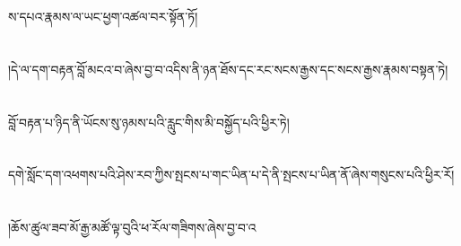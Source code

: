 ས་དཔའ་རྣམས་ལ་ཡང་ཕྱག་འཚལ་བར་སྟོན་ཏོ།\chapter{ }།དེ་ལ་དག་བརྟན་བློ་མངའ་བ་ཞེས་བྱ་བ་འདིས་ནི་ཉན་ཐོས་དང་རང་སངས་རྒྱས་དང་སངས་རྒྱས་རྣམས་བསྟན་ཏེ།\chapter{ }བློ་བརྟན་པ་ཉིད་ནི་ཡོངས་སུ་ཉམས་པའི་རླུང་གིས་མི་བསྐྱོད་པའི་ཕྱིར་ཏེ།\chapter{ }དགེ་སློང་དག་འཕགས་པའི་ཤེས་རབ་ཀྱིས་སྤངས་པ་གང་ཡིན་པ་དེ་ནི་སྤངས་པ་ཡིན་ནོ་ཞེས་གསུངས་པའི་ཕྱིར་རོ།\chapter{ }།ཆོས་ཚུལ་ཟབ་མོ་རྒྱ་མཚོ་ལྟ་བུའི་ཕ་རོལ་གཟིགས་ཞེས་བྱ་བ་འ